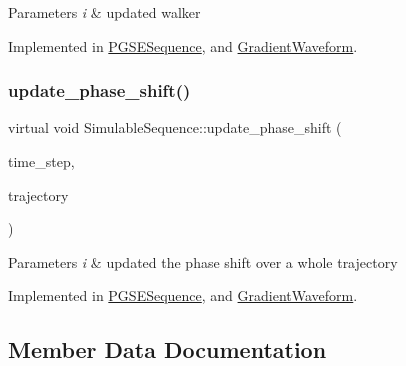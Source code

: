 \begin{DoxyParams}{Parameters}
{\em i} & updated walker \\
\hline
\end{DoxyParams}


Implemented in \hyperlink{class_p_g_s_e_sequence_a6914efd208eab28a1ee6a3f28ca65478}{P\+G\+S\+E\+Sequence}, and \hyperlink{class_gradient_waveform_a7421301b24b6c98e28ef9430287cdf8e}{Gradient\+Waveform}.

\mbox{\label{class_simulable_sequence_a175197d165ee7852094bc70cadc59589}} 
\subsubsection{\texorpdfstring{update\+\_\+phase\+\_\+shift()}{update\_phase\_shift()}\hspace{0.1cm}{\footnotesize\ttfamily [2/2]}}
{\footnotesize\ttfamily virtual void Simulable\+Sequence\+::update\+\_\+phase\+\_\+shift (\begin{DoxyParamCaption}\item[{double}]{time\+\_\+step,  }\item[{Eigen\+::\+Matrix3\+Xd}]{trajectory }\end{DoxyParamCaption})\hspace{0.3cm}{\ttfamily [pure virtual]}}


\begin{DoxyParams}{Parameters}
{\em i} & updated the phase shift over a whole trajectory \\
\hline
\end{DoxyParams}


Implemented in \hyperlink{class_p_g_s_e_sequence_a850a2f22cdf8b420888cfa906e03e078}{P\+G\+S\+E\+Sequence}, and \hyperlink{class_gradient_waveform_a2c606400c648cebd85827efa8d22b6bc}{Gradient\+Waveform}.



\subsection{Member Data Documentation}
\mbox{\label{class_simulable_sequence_a083961d839ed1433206ccbc481996409}} 

